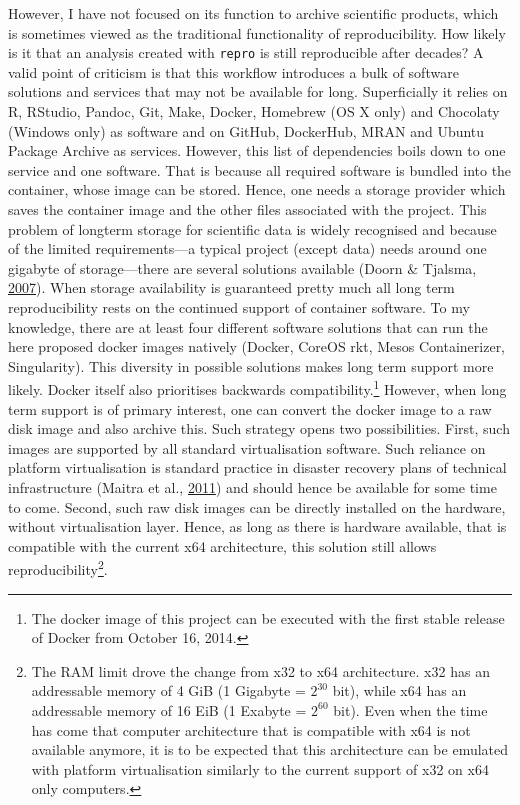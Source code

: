 \documentclass[12pt,a4paper,twoside]{article}
\begin{document}
However, I have not focused on its function to archive scientific products, which is sometimes viewed as the traditional functionality of reproducibility.
How likely is it that an analysis created with \texttt{repro} is still reproducible after decades?
A valid point of criticism is that this workflow introduces a bulk of software solutions and services that may not be available for long.
Superficially it relies on R, RStudio, Pandoc, Git, Make, Docker, Homebrew (OS X only) and Chocolaty (Windows only) as software and on GitHub, DockerHub, MRAN and Ubuntu Package Archive as services.
However, this list of dependencies boils down to one service and one software.
That is because all required software is bundled into the container, whose image can be stored.
Hence, one needs a storage provider which saves the container image and the other files associated with the project.
This problem of longterm storage for scientific data is widely recognised and because of the limited requirements---a typical project (except data) needs around one gigabyte of storage---there are several solutions available (Doorn \& Tjalsma, \protect\hyperlink{ref-doornIntroductionArchivingResearch2007}{2007}).
When storage availability is guaranteed pretty much all long term reproducibility rests on the continued support of container software.
To my knowledge, there are at least four different software solutions that can run the here proposed docker images natively (Docker, CoreOS rkt, Mesos Containerizer, Singularity).
This diversity in possible solutions makes long term support more likely. Docker itself also prioritises backwards compatibility.\footnote{The docker image of this project can be executed with the first stable release of Docker from October 16, 2014.}
However, when long term support is of primary interest, one can convert the docker image to a raw disk image and also archive this.
Such strategy opens two possibilities.
First, such images are supported by all standard virtualisation software.
Such reliance on platform virtualisation is standard practice in disaster recovery plans of technical infrastructure (Maitra et al., \protect\hyperlink{ref-maitraDisasterRecoveryPlanning2011}{2011}) and should hence be available for some time to come.
Second, such raw disk images can be directly installed on the hardware, without virtualisation layer.
Hence, as long as there is hardware available, that is compatible with the current x64 architecture, this solution still allows reproducibility\footnote{The RAM limit drove the change from x32 to x64 architecture. x32 has an addressable memory of 4 GiB (1 Gigabyte = \(2^{30}\) bit), while x64 has an addressable memory of 16 EiB (1 Exabyte = \(2^{60}\) bit). Even when the time has come that computer architecture that is compatible with x64 is not available anymore, it is to be expected that this architecture can be emulated with platform virtualisation similarly to the current support of x32 on x64 only computers.}.
\end{document}
